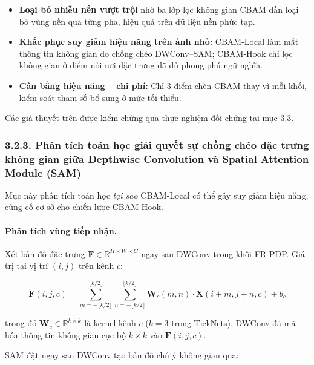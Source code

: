 \documentclass[
]{article}
\begin{document}
\begin{itemize}
\item \textbf{Loại bỏ nhiễu nền vượt trội} nhờ ba lớp lọc không gian CBAM dần loại bỏ vùng nền qua từng pha, hiệu quả trên dữ liệu nền phức tạp.

\item \textbf{Khắc phục suy giảm hiệu năng trên ảnh nhỏ:} CBAM-Local làm mất thông tin không gian do chồng chéo DWConv--SAM; CBAM-Hook chỉ lọc không gian ở điểm nối nơi đặc trưng đã đủ phong phú ngữ nghĩa.

\item \textbf{Cân bằng hiệu năng -- chi phí:} Chỉ 3 điểm chèn CBAM thay vì mỗi khối, kiểm soát tham số bổ sung ở mức tối thiểu.
\end{itemize}

Các giả thuyết trên được kiểm chứng qua thực nghiệm đối chứng tại mục 3.3.

\subsubsection{3.2.3. Phân tích toán học giải quyết sự chồng chéo đặc trưng không gian giữa Depthwise Convolution và Spatial Attention Module (SAM)}\label{3-2-3-math-analysis}

Mục này phân tích toán học \textit{tại sao} CBAM-Local có thể gây suy giảm hiệu năng, củng cố cơ sở cho chiến lược CBAM-Hook.

\paragraph{Phân tích vùng tiếp nhận.}

Xét bản đồ đặc trưng $\mathbf{F} \in \mathbb{R}^{H \times W \times C}$ ngay sau DWConv trong khối FR-PDP. Giá trị tại vị trí $(i, j)$ trên kênh $c$:

\begin{equation}
\mathbf{F}(i, j, c) = \sum_{m=-\lfloor k/2 \rfloor}^{\lfloor k/2 \rfloor} \sum_{n=-\lfloor k/2 \rfloor}^{\lfloor k/2 \rfloor} \mathbf{W}_c(m, n) \cdot \mathbf{X}(i+m, j+n, c) + b_c
\label{eq:dwconv}
\end{equation}

trong đó $\mathbf{W}_c \in \mathbb{R}^{k \times k}$ là kernel kênh $c$ ($k = 3$ trong TickNets). DWConv đã mã hóa thông tin không gian cục bộ $k \times k$ vào $\mathbf{F}(i, j, c)$.

SAM đặt ngay sau DWConv tạo bản đồ chú ý không gian qua:
\end{document}
